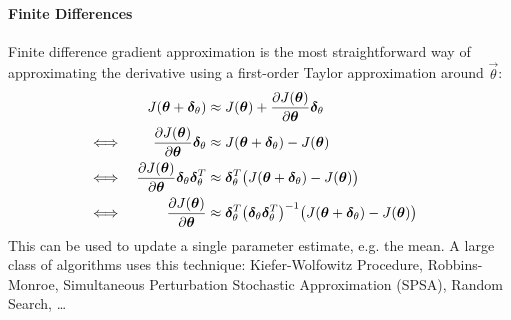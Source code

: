 				\paragraph{Finite Differences}
					Finite difference gradient approximation is the most straightforward way of approximating the derivative using a first-order Taylor approximation around \(\vec{\theta}\):
					\begin{align*}
						&&
						J(\bm{\theta} + \bm{\delta}_\theta) &\approx J(\bm{\theta}) + \pdv{J(\bm{\theta})}{\bm{\theta}} \bm{\delta}_\theta & \\
						\iff &&
						\pdv{J(\bm{\theta})}{\bm{\theta}} \bm{\delta}_\theta &\approx J(\bm{\theta} + \bm{\delta}_\theta) - J(\bm{\theta}) & \\
						\iff &&
						\pdv{J(\bm{\theta})}{\bm{\theta}} \bm{\delta}_\theta \bm{\delta}_\theta^T &\approx \bm{\delta}_\theta^T \big( J(\bm{\theta} + \bm{\delta}_\theta) - J(\bm{\theta}) \big) & \\
						\iff &&
						\pdv{J(\bm{\theta})}{\bm{\theta}} &\approx \bm{\delta}_\theta^T \big( \bm{\delta}_\theta \bm{\delta}_\theta^T \big)^{-1} \big( J(\bm{\theta} + \bm{\delta}_\theta) - J(\bm{\theta}) \big) &
					\end{align*}
					This can be used to update a single parameter estimate, e.g. the mean. A large class of algorithms uses this technique: Kiefer-Wolfowitz Procedure, Robbins-Monroe, Simultaneous Perturbation Stochastic Approximation (SPSA), Random Search, \dots

